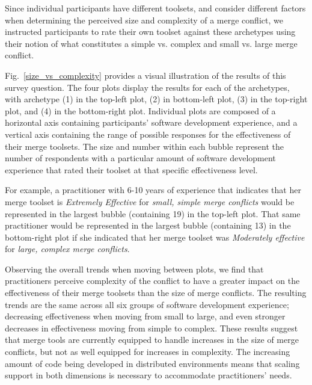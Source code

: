 Since individual participants have different toolsets, and consider different factors when determining the perceived size and complexity of a merge conflict, we instructed participants to rate their own toolset against these archetypes using their notion of what constitutes a simple vs. complex and small vs. large merge conflict.

Fig.~\ref{size_vs_complexity} provides a visual illustration of the results of this survey question.
The four plots display the results for each of the archetypes, with archetype (1) in the top-left plot, (2) in bottom-left plot, (3) in the top-right plot, and (4) in the bottom-right plot.
Individual plots are composed of a horizontal axis containing participants' software development experience, and a vertical axis containing the range of possible responses for the effectiveness of their merge toolsets.
The size and number within each bubble represent the number of respondents with a particular amount of software development experience that rated their toolset at that specific effectiveness level.

For example, a practitioner with 6-10 years of experience that indicates that her merge toolset is \textit{Extremely Effective} for \textit{small, simple merge conflicts} would be represented in the largest bubble (containing 19) in the top-left plot.
That same practitioner would be represented in the largest bubble (containing 13) in the bottom-right plot if she indicated that her merge toolset was \textit{Moderately effective} for \textit{large, complex merge conflicts}.

Observing the overall trends when moving between plots, we find that practitioners perceive complexity of the conflict to have a greater impact on the effectiveness of their merge toolsets than the size of merge conflicts.
The resulting trends are the same across all six groups of software development experience; decreasing effectiveness when moving from small to large, and even stronger decreases in effectiveness moving from simple to complex.
These results suggest that merge tools are currently equipped to handle increases in the size of merge conflicts, but not as well equipped for increases in complexity.
The increasing amount of code being developed in distributed environments means that scaling support in both dimensions is necessary to accommodate practitioners' needs.